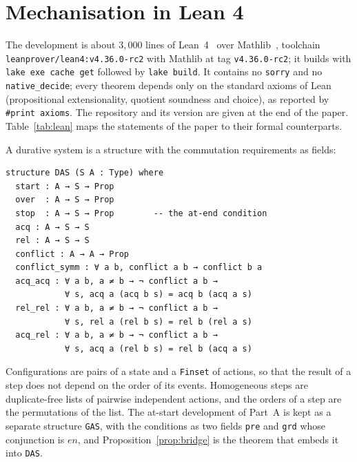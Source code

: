 \documentclass[preprint,12pt]{elsarticle}
\theoremstyle{plain}
\theoremstyle{definition}
\newcommand{\en}{\mathit{en}}
\begin{document}
\section{Mechanisation in Lean 4}
\label{sec:lean}

The development is about $3{,}000$ lines of Lean~4~\cite{deMouraUllrich2021} over Mathlib~\cite{Mathlib2020}, toolchain \texttt{leanprover/lean4:v4.36.0-rc2} with Mathlib at tag \texttt{v4.36.0-rc2}; it builds with \texttt{lake exe cache get} followed by \texttt{lake build}. It contains no \texttt{sorry} and no \texttt{native\_decide}; every theorem depends only on the standard axioms of Lean (propositional extensionality, quotient soundness and choice), as reported by \texttt{\#print axioms}. The repository and its version are given at the end of the paper. Table~\ref{tab:lean} maps the statements of the paper to their formal counterparts.

A durative system is a structure with the commutation requirements as fields:

\begin{lstlisting}
structure DAS (S A : Type) where
  start : A → S → Prop
  over  : A → S → Prop
  stop  : A → S → Prop        -- the at-end condition
  acq : A → S → S
  rel : A → S → S
  conflict : A → A → Prop
  conflict_symm : ∀ a b, conflict a b → conflict b a
  acq_acq : ∀ a b, a ≠ b → ¬ conflict a b →
            ∀ s, acq a (acq b s) = acq b (acq a s)
  rel_rel : ∀ a b, a ≠ b → ¬ conflict a b →
            ∀ s, rel a (rel b s) = rel b (rel a s)
  acq_rel : ∀ a b, a ≠ b → ¬ conflict a b →
            ∀ s, acq a (rel b s) = rel b (acq a s)
\end{lstlisting}

\noindent Configurations are pairs of a state and a \texttt{Finset} of actions, so that the result of a step does not depend on the order of its events. Homogeneous steps are duplicate-free lists of pairwise independent actions, and the orders of a step are the permutations of the list. The at-start development of Part~A is kept as a separate structure \texttt{GAS}, with the conditions as two fields \texttt{pre} and \texttt{grd} whose conjunction is $\en$, and Proposition~\ref{prop:bridge} is the theorem that embeds it into \texttt{DAS}.
\end{document}

